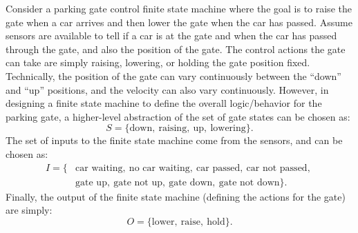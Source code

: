 \begin{example} \label{ex:parkinggate}
\theoremstyle{definition}
Consider a parking gate control finite state machine where the goal is to raise the gate when a car arrives and then lower the gate when the car has passed. Assume sensors are available to tell if a car is at the gate and when the car has passed through the gate, and also the position of the gate. The control actions the gate can take are simply raising, lowering, or holding the gate position fixed. Technically, the position of the gate can vary continuously between the ``down'' and ``up'' positions, and the velocity can also vary continuously. However, in designing a finite state machine to define the overall logic/behavior for the parking gate, a higher-level abstraction of the set of gate states can be chosen as:
\begin{equation*}
S = \{\text{down}, \: \text{raising}, \:\text{up},\: \text{lowering}\}.
\end{equation*}
The set of inputs to the finite state machine come from the sensors, and can be chosen as:
\begin{equation*}
\begin{split}
I = \{&\text{car waiting}, \: \text{no car waiting}, \:\text{car passed},\: \text{car not passed},\: \\ &\text{gate up}, \: \text{gate not up},\: \text{gate down},\: \text{gate not down} \}.    
\end{split}
\end{equation*}
Finally, the output of the finite state machine (defining the actions for the gate) are simply:
\begin{equation*}
O = \{\text{lower}, \: \text{raise}, \:\text{hold}\}.
\end{equation*}


\end{example}
